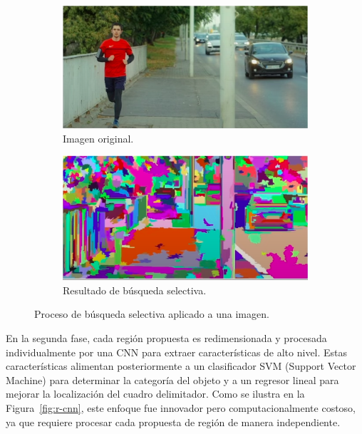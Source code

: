 \documentclass[11pt,spanish,listoffigures,listoftables]{tfgetsinf}
\begin{document}
\begin{figure}[H]
   \centering
   \begin{subfigure}[b]{0.45\textwidth}
      \centering
      \includegraphics[width=\textwidth]{images/estado_del_arte/selective_search_original.png}
      \caption{Imagen original.}
      \label{fig:selective_search_original}
   \end{subfigure}
   \hfill
   \begin{subfigure}[b]{0.45\textwidth}
      \centering
      \includegraphics[width=\textwidth]{images/estado_del_arte/selective_search_result.png}
      \caption{Resultado de búsqueda selectiva.}     
      \label{fig:selective_search_result}
   \end{subfigure}
   \caption{Proceso de búsqueda selectiva aplicado a una imagen.}
   \label{fig:selective_search}
\end{figure}

En la segunda fase, cada región propuesta es redimensionada y procesada individualmente por una CNN para extraer características de alto nivel. Estas características alimentan posteriormente a un clasificador SVM (Support Vector Machine) para determinar la categoría del objeto y a un regresor lineal para mejorar la localización del cuadro delimitador. Como se ilustra en la Figura~\ref{fig:r-cnn}, este enfoque fue innovador pero computacionalmente costoso, ya que requiere procesar cada propuesta de región de manera independiente.
\end{document}

